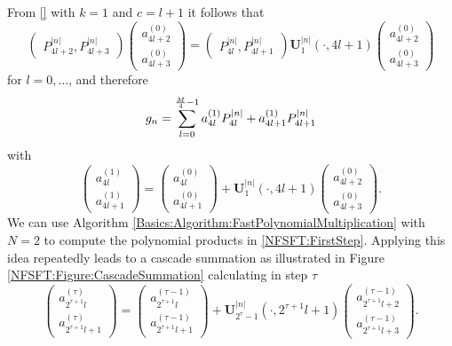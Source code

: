 From \eqref{} with $k = 1$ and $c = l+1$ it follows that
$$
\left(\begin{array}{c}
  P_{4l+2}^{|n|}, 
  P_{4l+3}^{|n|}
\end{array}\right)
\left(\begin{array}{c}
  a_{4l+2}^{(0)}\\
  a_{4l+3}^{(0)} 
\end{array}\right)
=
\left(\begin{array}{c}
  P_{4l}^{|n|},
  P_{4l+1}^{|n|}
\end{array}\right)
{\mathbf{U}_{1}^{|n|}\left(\cdot,4l+1\right)}
\left(\begin{array}{c}
  a_{4l+2}^{(0)}\\
  a_{4l+3}^{(0)} 
\end{array}\right)
$$
for $l=0,\ldots,\frac{}{}$and therefore
$$ g_n = \sum_{l = 0}^{\frac{M}{4}-1} a_{4l}^{(1)} P_{4l}^{\left\vert n\right\vert} + a_{4l+1}^{(1)} P_{4l+1}^{\left\vert n\right\vert} $$
with
\begin{equation}
\label{NFSFT:FirstStep}
  \left(\begin{array}{c}
    a_{4l}^{(1)}\\
    a_{4l+1}^{(1)} 
  \end{array}\right)
  =
  \left(\begin{array}{c}
    a_{4l}^{(0)}\\
    a_{4l+1}^{(0)} 
  \end{array}\right)
  + {\mathbf{U}_{1}^{|n|}\left(\cdot,4l+1\right)}
  \left(\begin{array}{c}
    a_{4l+2}^{(0)}\\
    a_{4l+3}^{(0)} 
  \end{array}\right).
\end{equation}
We can use Algorithm \ref{Basics:Algorithm:FastPolynomialMultiplication} with $N=2$ to compute 
the polynomial products in \eqref{NFSFT:FirstStep}. Applying this idea repeatedly leads to a cascade 
summation as illustrated in Figure \ref{NFSFT:Figure:CascadeSummation} calculating in step $\tau$
\begin{equation}
  \nonumber
  \left(\begin{array}{c}
    a_{2^{\tau+1}l}^{(\tau)}\\
    a_{2^{\tau+1}l+1}^{(\tau)} 
  \end{array}\right)
  =
  \left(\begin{array}{c}
    a_{2^{\tau+1}l}^{(\tau-1)}\\
    a_{2^{\tau+1}l+1}^{(\tau-1)} 
  \end{array}\right)
  + {\mathbf{U}_{2^{\tau}-1}^{|n|}\left(\cdot,2^{\tau+1}l+1\right)}
  \left(\begin{array}{c}
    a_{2^{\tau+1}l+2}^{(\tau-1)}\\
    a_{2^{\tau+1}l+3}^{(\tau-1)} 
  \end{array}\right).
\end{equation}

